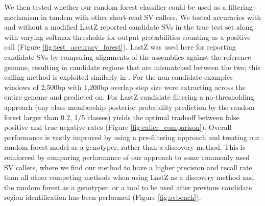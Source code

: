 We then tested whether our random forest classifier could be used as a filtering mechanism in tandem with other short-read SV callers. We tested accuracies with and without a modified LastZ \cite{chakrabortyStructuralVariantsExhibit2019} reported candidate SVs in the true test set along with varying softmax thresholds for output probabilities counting as a positive call (Figure \ref{fig:test_accuracy_forest}). LastZ was used here for reporting candidate SVs by comparing alignments of the assemblies against the reference genome, resulting in candidate regions that are mismatched between the two; this calling method is exploited similarly in \cite{chakrabortyEvolutionGenomeStructure2021}. For the non-candidate examples windows of 2,500bp with 1,200bp overlap step size were extracting across the entire genome and predicted on. For LastZ candidate filtering a no-thresholding approach (any class membership posterior probability prediction by the random forest larger than 0.2, 1/5 classes) yields the optimal tradeoff between false positive and true negative rates (Figure \ref{fig:caller_comparison}). Overall performance is vastly improved by using a pre-filtering approach and treating our random forest model as a genotyper, rather than a discovery method. This is reinforced by comparing performance of our approach to some commonly used SV callers, where we find our method to have a higher precision and recall rate than all other competing methods when using LastZ as a discovery method and the random forest as a genotyper, or a tool to be used after previous candidate region identification has been performed (Figure \ref{fig:svbench}).

